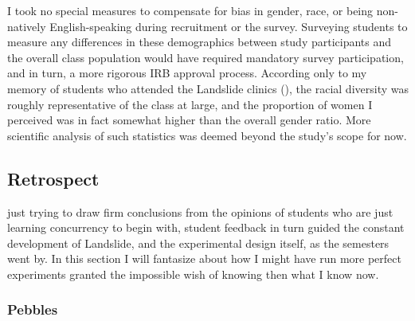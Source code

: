 I took no special measures to compensate for bias in gender, race, or being non-natively English-speaking
during recruitment or the survey.
Surveying students to measure any differences in these demographics between study participants and the overall class population
would have required mandatory survey participation,
and in turn, a more rigorous IRB approval process.
According only to my memory of students who attended the Landslide clinics
(\sect{\ref{sec:education-pebbles-recruiting}}),
the racial diversity was roughly representative of the class at large,
and the proportion of women I perceived was in fact somewhat higher than the overall gender ratio.
More scientific analysis of such statistics was deemed beyond the study's scope for now.

\subsection{Retrospect}

 just trying to draw firm conclusions from
the opinions of students who are just learning concurrency to begin with,
student feedback in turn guided the constant development
of Landslide, and the experimental design itself,
as the semesters went by.
In this section I will fantasize about how I might have run more perfect experiments
granted the impossible wish of knowing then what I know now.

\subsubsection{Pebbles}

